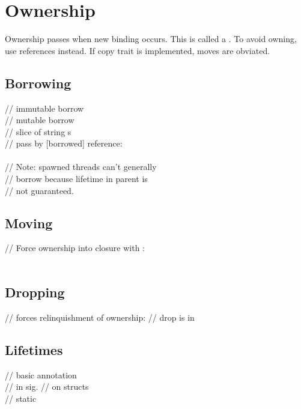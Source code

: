 \section{Ownership}
Ownership passes when new binding occurs.  This is called a .  To avoid owning, use  references instead. If copy trait is implemented, moves are obviated. \\

\subsection*{Borrowing}
 // immutable borrow \\
 // mutable borrow \\
 // slice of string s\\
// pass by [borrowed] reference: \\
 \\
// Note: spawned threads can't generally \\
// borrow because lifetime in parent is \\
// not guaranteed. \\

\subsection*{Moving}
// Force ownership into closure with : \\
 \\

\subsection*{Dropping}
//  forces relinquishment of ownership:
 // drop is in  \\

\subsection*{Lifetimes}

 // basic annotation \\
 // in sig.
 // on structs \\
 // static \\
